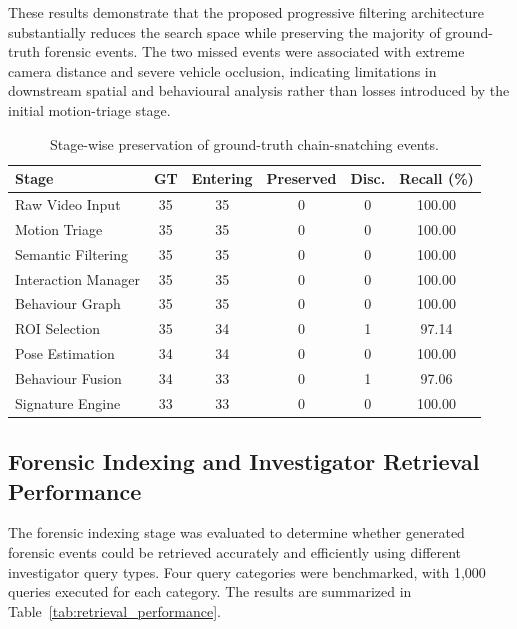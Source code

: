 \documentclass[runningheads]{llncs}
\begin{document}
These results demonstrate that the proposed progressive filtering
architecture substantially reduces the search space while preserving
the majority of ground-truth forensic events. The two missed events were
associated with extreme camera distance and severe vehicle occlusion,
indicating limitations in downstream spatial and behavioural analysis
rather than losses introduced by the initial motion-triage stage.

\begin{table}[htbp]
\centering
\scriptsize
\setlength{\tabcolsep}{2.5pt}
\renewcommand{\arraystretch}{0.85}
\caption{Stage-wise preservation of ground-truth chain-snatching events.}
\label{tab:event_preservation}

\begin{tabular}{lccccc}
\hline
\textbf{Stage} &
\textbf{GT} &
\textbf{Entering} &
\textbf{Preserved} &
\textbf{Disc.} &
\textbf{Recall (\%)} \\
\hline
Raw Video Input       & 35 & 35 & 0  & 0 & 100.00 \\
Motion Triage         & 35 & 35 & 0  & 0 & 100.00 \\
Semantic Filtering    & 35 & 35 & 0  & 0 & 100.00 \\
Interaction Manager   & 35 & 35 & 0  & 0 & 100.00 \\
Behaviour Graph       & 35 & 35 & 0  & 0 & 100.00 \\
ROI Selection         & 35 & 34 & 0  & 1 & 97.14 \\
Pose Estimation       & 34 & 34 & 0  & 0 & 100.00 \\
Behaviour Fusion      & 34 & 33 & 0  & 1 & 97.06 \\
Signature Engine      & 33 & 33 & 0  & 0 & 100.00 \\
\hline
\end{tabular}
\end{table}

\subsection{Forensic Indexing and Investigator Retrieval Performance}

The forensic indexing stage was evaluated to determine whether generated
forensic events could be retrieved accurately and efficiently using
different investigator query types. Four query categories were
benchmarked, with 1,000 queries executed for each category. The results
are summarized in Table~\ref{tab:retrieval_performance}.
\end{document}
